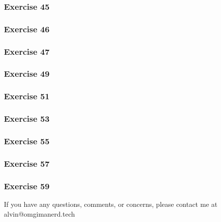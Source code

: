 \documentclass[letterpaper, 12pt]{math}
\begin{document}
\subsubsection*{Exercise 45}
\subsubsection*{Exercise 46}
\subsubsection*{Exercise 47}
\subsubsection*{Exercise 49}
\subsubsection*{Exercise 51}
\subsubsection*{Exercise 53}
\subsubsection*{Exercise 55}
\subsubsection*{Exercise 57}
\subsubsection*{Exercise 59}

\begin{center}
  If you have any questions, comments, or concerns, please contact me at
  alvin@omgimanerd.tech
\end{center}
\end{document}
